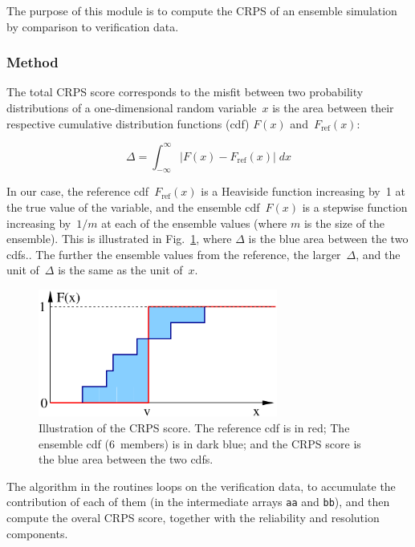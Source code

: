 \documentclass[11pt]{article}
\begin{document}
The purpose of this module is to compute the CRPS
of an ensemble simulation by comparison to verification data.

\subsubsection*{Method}

The total CRPS score corresponds to the misfit between two probability distributions
of a one-dimensional random variable~$x$ is the area
between their respective cumulative distribution functions (cdf)
$F(x)$ and~$F_{\mbox{ref}}(x)$:

\begin{equation}
\label{eq:crps}
\Delta = \int_{-\infty}^{\infty}
\left| F(x) - F_{\mbox{ref}}(x) \right| \; dx
\end{equation}

\noindent
In our case, the reference cdf~$F_{\mbox{ref}}(x)$
is a Heaviside function increasing by~1
at the true value of the variable,
and the ensemble cdf~$F(x)$ is a stepwise function
increasing by~$1/m$ at each of the ensemble values
(where $m$ is the size of the ensemble).
This is illustrated in Fig.~\ref{fig:crps},
where $\Delta$ is the blue area between the two cdfs..
The further the ensemble values from the reference,
the larger~$\Delta$, and the unit of~$\Delta$
is the same as the unit of~$x$.

\begin{figure}[htbp]
\centerline{
\includegraphics[width=0.7\textwidth]{Figures/ensscores_crps.pdf}
}
\caption{Illustration of the CRPS score.
The reference cdf is in red;
The ensemble cdf (6~members) is in dark blue;
and the CRPS score is the blue area between the two cdfs.
\label{fig:crps}}
\end{figure}

The algorithm in the routines loops on the verification data,
to accumulate the contribution of each of them
(in the intermediate arrays {\tt aa} and {\tt bb}),
and then compute the overal CRPS score,
together with the reliability and resolution components.
\end{document}
